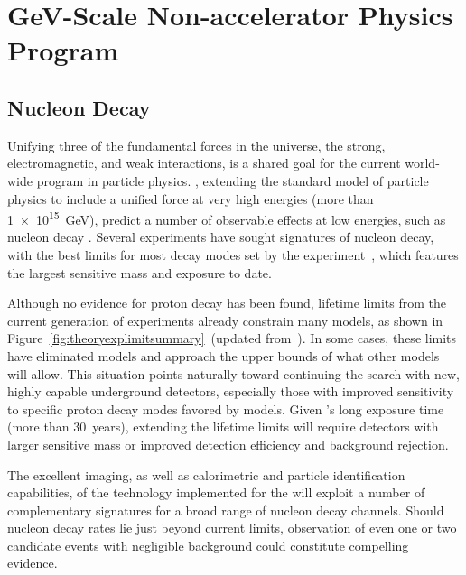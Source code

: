 \chapter{GeV-Scale Non-accelerator Physics Program}
\label{ch:nonaccel}


\section{Nucleon Decay}
\label{sec:nonaccel-ndk}

Unifying three of the fundamental forces in the universe, the strong, 
electromagnetic, and weak interactions, is a shared goal for the current 
world-wide program in particle physics. , extending the standard model of particle physics to include a unified force 
at very high energies  (more than \SI{1e15}{\GeV}), predict a number of observable 
effects at low energies, such as nucleon  decay \cite{Pati:1973rp,Georgi:1974sy,Dimopoulos:1981dw,Langacker:1980js,deBoer:1994dg,Nath:2006ut}. Several experiments have sought signatures of nucleon decay, with the best limits for most decay modes set by the \superk experiment~\cite{Miura:2016krn,Abe:2014mwa,TheSuper-Kamiokande:2017tit}, 
which features the largest sensitive mass and exposure to date. 

Although no evidence for proton decay has been found, lifetime limits from the current generation of experiments already constrain many  models, as shown in Figure~\ref{fig:theoryexplimitsummary}~(updated from~\cite{Babu:2013jba}). In some cases, these limits have eliminated models and approach the upper bounds of what other models will allow. This situation points naturally toward continuing the search with new, highly capable underground detectors, especially those with improved sensitivity to specific proton decay modes favored by  models. Given \superk's long exposure time (more than \SI{30}{years}), extending the lifetime limits will require detectors with larger sensitive mass or improved detection efficiency and background rejection.  

The excellent imaging, as well as calorimetric and particle identification capabilities, of the  technology  implemented for the   will exploit a number of complementary signatures for a broad range of nucleon decay channels.  Should nucleon decay rates lie just beyond current limits, observation of even one or two candidate events with negligible background could constitute compelling evidence.

